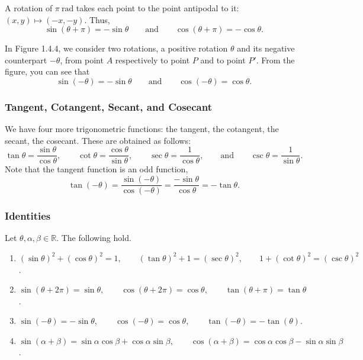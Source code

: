 \documentclass[11pt]{book}
\theoremstyle{break}
\theoremstyle{no_label}
\newcommand{\bbR}{\mathbb{R}}
\numberwithin{equation}{section}
\begin{document}
\vspace*{1.5em}

A rotation of $\pi\ \text{rad}$ takes each point to the point antipodal to it: $(x, y)\mapsto(-x, -y)$. Thus, $$\sin(\theta+\pi)=-\sin\theta\qquad\text{and}\qquad\cos(\theta+\pi)=-\cos\theta.$$

In Figure 1.4.4, we consider two rotations, a positive rotation $\theta$ and its negative counterpart $-\theta$, from point $A$ respectively to point $P$ and to point $P'$. From the figure, you can see that $$\sin(-\theta)=-\sin\theta\qquad\text{and}\qquad\cos(-\theta)=\cos\theta.$$

\subsubsection*{Tangent, Cotangent, Secant, and Cosecant}

We have four more trigonometric functions: the tangent, the cotangent, the secant, the cosecant. These are obtained as follows: $$\tan\theta=\dfrac{\sin\theta}{\cos\theta},\qquad\cot\theta=\dfrac{\cos\theta}{\sin\theta},\qquad\sec\theta=\dfrac{1}{\cos\theta},\qquad\text{and}\qquad\csc\theta=\dfrac{1}{\sin\theta}.$$ Note that the tangent function is an odd function, $$\tan(-\theta)=\dfrac{\sin(-\theta)}{\cos(-\theta)}=\dfrac{-\sin\theta}{\cos\theta}=-\tan\theta.$$

\subsubsection*{Identities}

\begin{theorem}
    Let $\theta, \alpha, \beta\in\bbR$. The following hold.
    \begin{enumerate}
        \item $(\sin\theta)^2+(\cos\theta)^2=1, \qquad (\tan\theta)^2+1=(\sec\theta)^2,\qquad 1+(\cot\theta)^2=(\csc\theta)^2$.
        \item $\sin(\theta+2\pi)=\sin\theta,\qquad\cos(\theta+2\pi)=\cos\theta,\qquad\tan(\theta+\pi)=\tan\theta$.
        \item $\sin(-\theta)=-\sin\theta,\qquad\cos(-\theta)=\cos\theta,\qquad\tan(-\theta)=-\tan(\theta)$.
        \item $\sin(\alpha+\beta)=\sin\alpha\cos\beta+\cos\alpha\sin\beta,\qquad\cos(\alpha+\beta)=\cos\alpha\cos\beta-\sin\alpha\sin\beta$.
    \end{enumerate}
\end{theorem}
\end{document}
